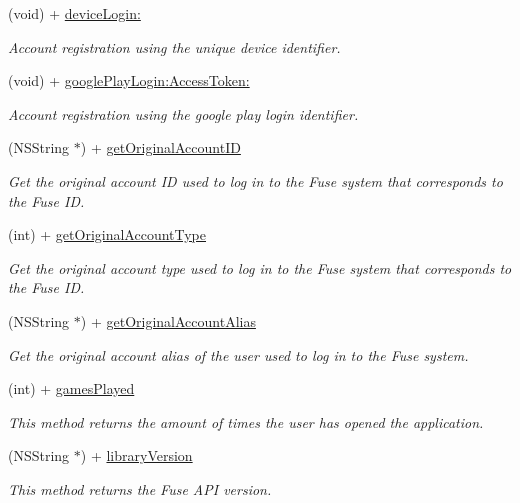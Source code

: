\begin{DoxyCompactItemize}
(void) + \hyperlink{interface_fuse_a_p_i_ae3a27f858739fee7ad6483a909206943}{device\+Login\+:}
\begin{DoxyCompactList}\small\item\em Account registration using the unique device identifier. \end{DoxyCompactList}\item 
(void) + \hyperlink{interface_fuse_a_p_i_a826545aa45a550cbc10cc98137ee5898}{google\+Play\+Login\+:\+Access\+Token\+:}
\begin{DoxyCompactList}\small\item\em Account registration using the google play login identifier. \end{DoxyCompactList}\item 
(N\+S\+String $\ast$) + \hyperlink{interface_fuse_a_p_i_a49b43f13a0efee7d2af60197d0ae341c}{get\+Original\+Account\+I\+D}
\begin{DoxyCompactList}\small\item\em Get the original account I\+D used to log in to the Fuse system that corresponds to the Fuse I\+D. \end{DoxyCompactList}\item 
(int) + \hyperlink{interface_fuse_a_p_i_a0571f2d960109dc9bff59c6575bf2534}{get\+Original\+Account\+Type}
\begin{DoxyCompactList}\small\item\em Get the original account type used to log in to the Fuse system that corresponds to the Fuse I\+D. \end{DoxyCompactList}\item 
(N\+S\+String $\ast$) + \hyperlink{interface_fuse_a_p_i_ab49bb189bd1ebaf871f24a7c4e4b5290}{get\+Original\+Account\+Alias}
\begin{DoxyCompactList}\small\item\em Get the original account alias of the user used to log in to the Fuse system. \end{DoxyCompactList}\item 
(int) + \hyperlink{interface_fuse_a_p_i_afb8604dccdbf7c0b507074a649b75da9}{games\+Played}
\begin{DoxyCompactList}\small\item\em This method returns the amount of times the user has opened the application. \end{DoxyCompactList}\item 
(N\+S\+String $\ast$) + \hyperlink{interface_fuse_a_p_i_a56f5fc3ba2e03d3dbe9d681b3500108a}{library\+Version}
\begin{DoxyCompactList}\small\item\em This method returns the Fuse A\+P\+I version. \end{DoxyCompactList}\item 

\end{DoxyCompactItemize}

